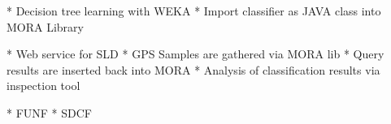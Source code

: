 \documentclass[times, 10pt,twocolumn]{article}
\begin{document}

* Decision tree learning with WEKA
* Import classifier as JAVA class into MORA Library

* Web service for SLD
* GPS Samples are gathered via MORA lib
* Query results are inserted back into MORA
* Analysis of classification results via inspection tool


* FUNF
* SDCF


\nocite{ex1,ex2}


\end{document}
